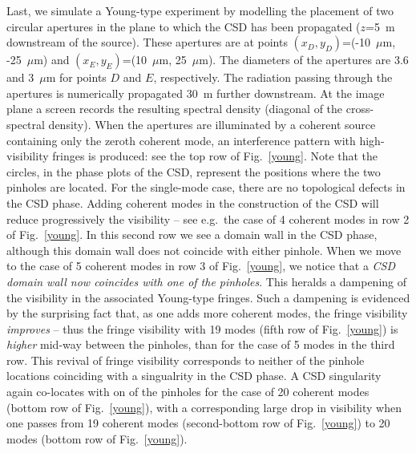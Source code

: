 \documentclass[%
 reprint,
 amsmath,amssymb,
 aps,
]{revtex4-1}
\begin{document}
Last, we  simulate a Young-type experiment by modelling the placement of two circular apertures in the plane to which the CSD has been propagated ($z$=5~m downstream of the source). These apertures are at points $(x_D,y_D)$=(-10~$\mu$m, -25~$\mu$m) and  $(x_E,y_E)$=(10~$\mu$m, 25~$\mu$m). The diameters of the apertures are 3.6 and 3~$\mu$m for points $D$ and $E$, respectively. The radiation passing through the apertures is numerically propagated 30~m further downstream. At the image plane a screen records the resulting spectral density (diagonal of the cross-spectral density). When the apertures are illuminated by a coherent source containing only the zeroth coherent mode, an interference pattern with high-visibility fringes is produced: see the top row of Fig.~\ref{young}. Note that the circles, in the phase plots of the CSD, represent the positions where the two pinholes are located.  For the single-mode case, there are no topological defects in the CSD phase.  Adding coherent modes in the construction of the CSD will reduce progressively the visibility -- see e.g.~the case of 4 coherent modes in row 2 of Fig.~\ref{young}.  In this second row we see a domain wall in the CSD phase, although this domain wall does not coincide with either pinhole.  When we move to the case of 5 coherent modes in row 3 of Fig.~\ref{young}, we notice that a {\em CSD domain wall now coincides with one of the pinholes}.  This heralds a dampening of the visibility in the associated Young-type fringes.  Such a dampening is evidenced by the surprising fact that, as one adds more coherent modes, the fringe visibility {\em improves} -- thus the fringe visibility with 19 modes (fifth row of Fig.~\ref{young}) is {\em higher} mid-way between the pinholes, than for the case of 5 modes in the third row.  This revival of fringe visibility corresponds to neither of the pinhole locations coinciding with a singualrity in the CSD phase.  A CSD singularity again co-locates with on of the pinholes for the case of 20 coherent modes (bottom row of Fig.~\ref{young}), with a corresponding large drop in visibility when one passes from  19 coherent modes (second-bottom row of Fig.~\ref{young}) to 20 modes (bottom row of Fig.~\ref{young}).%
\end{document}
